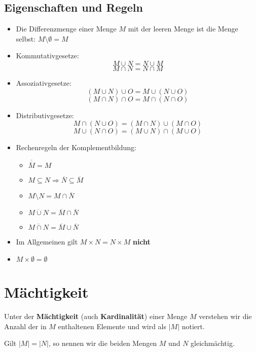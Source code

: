 \documentclass[../../main.tex]{subfiles}
\begin{document}
	\subsection*{Eigenschaften und Regeln}
	\begin{itemize}
		\item Die Differenzmenge einer Menge $M$ mit der leeren Menge ist die Menge selbst: $M \setminus \emptyset = M$
		\item Kommutativgesetze: $$M \cup N = N \cup M$$ $$M \cap N = N \cap M$$
		\item Assoziativgesetze: $$(M \cup N) \cup O = M \cup (N \cup O)$$ $$(M \cap N) \cap O = M \cap (N \cap O)$$
		\item Distributivgesetze: $$M \cap (N \cup O) = (M \cap N) \cup (M \cap O)$$ $$M \cup (N \cap O) = (M \cup N) \cap (M \cup O)$$
		\item Rechenregeln der Komplementbildung:
		\begin{itemize}
			\item $\overline{\overline{M}} = M$
			\item $M \subseteq N \Rightarrow \overline{N} \subseteq \overline{M}$
			\item $M \setminus N = M \cap \overline{N}$
			\item $\overline{M \cup N} = \overline{M} \cap \overline{N}$
			\item $\overline{M \cap N} = \overline{M} \cup \overline{N}$
		\end{itemize}
		\item Im Allgemeinen gilt $M \times N = N \times M$ \textbf{nicht}
		\item $M \times \emptyset = \emptyset$
	\end{itemize}

	\section{Mächtigkeit}
	
	\begin{definition}
		Unter der \textbf{Mächtigkeit} (auch \textbf{Kardinalität}) einer Menge $M$ verstehen wir die Anzahl der in $M$ enthaltenen Elemente und wird als $|M|$ notiert. 
	\end{definition}

	Gilt $|M| = |N|$, so nennen wir die beiden Mengen $M$ und $N$ gleichmächtig. 
	
	
\end{document}
